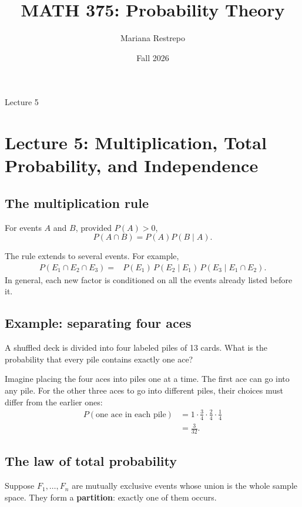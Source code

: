 \documentclass[11pt]{article}
\title{MATH 375: Probability Theory}
\author{Mariana Restrepo}
\date{Fall 2026}
\begin{document}
\maketitle

\begin{center}
\large Lecture 5
\end{center}

\tableofcontents

\section{Lecture 5: Multiplication, Total Probability, and Independence}

\subsection{The multiplication rule}

For events $A$ and $B$, provided $P(A)>0$,
\[
P(A\cap B)=P(A)P(B\mid A).
\]

The rule extends to several events. For example,
\[
\begin{aligned}
P(E_1\cap E_2\cap E_3)
={}&P(E_1)\,
P(E_2\mid E_1)\,
P(E_3\mid E_1\cap E_2).
\end{aligned}
\]
In general, each new factor is conditioned on all the events
already listed before it.

\subsection{Example: separating four aces}

A shuffled deck is divided into four labeled piles of 13 cards.
What is the probability that every pile contains exactly one ace?

Imagine placing the four aces into piles one at a time. The first
ace can go into any pile. For the other three aces to go into
different piles, their choices must differ from the earlier ones:
\[
\begin{aligned}
P(\text{one ace in each pile})
&=1\cdot\frac34\cdot\frac24\cdot\frac14\\
&=\boxed{\frac{3}{32}}.
\end{aligned}
\]

\subsection{The law of total probability}

Suppose $F_1,\ldots,F_n$ are mutually exclusive events whose union
is the whole sample space. They form a \textbf{partition}: exactly
one of them occurs.
\end{document}
